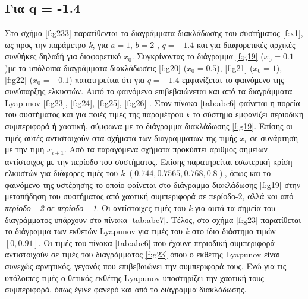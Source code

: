 \subsection{Για q = -1.4}
Στο σχήμα \ref{f:g233} παρατίθενται τα διαγράμματα διακλάδωσης του συστήματος \ref{f:x1}, ως προς την παράμετρο \emph{k}, για $a = 1$, $b = 2$ , $q =- 1.4$ και για διαφορετικές αρχικές συνθήκες δηλαδή για διαφορετικό \(x_0\). Συγκρίνοντας το διάγραμμα \ref{f:g19} (\(x_0=0.1\))με τα υπόλοιπα διαγράμματα διακλάδωσεις \ref{f:g20} (\(x_0=0.5\)), \ref{f:g21} (\(x_0=1\)), \ref{f:g22} (\(x_0=-0.1\)) πατατηρείται ότι για $q=-1.4$ εμφανίζεται το φαινόμενο της συνύπαρξης ελκυστών. Αυτό το φαινόμενο επιβεβαιώνεται και από τα διαγράμματα Lyapunov \ref{f:g23}, \ref{f:g24}, \ref{f:g25}, \ref{f:g26} .
Στον πίνακα \ref{tab:abc6} φαίνεται η πορεία του συστήματος και για ποιές τιμές της παραμέτρου  \emph{k} το σύστημα εμφανίζει περιοδική συμπεριφορά ή χαοτική, σύμφωνα με το διάγραμμα διακλάδωσης \ref{f:g19}. Επίσης οι τιμές αυτές αντιστοιχούν στα σχήματα των διαγραμματων της τιμής \(x_i\) σε συνάρτηση με την τιμή \(x_{i+1}\). Από τα παραγόμενα σχήματα προκύπτει αριθμός σημείων αντίστοιχος με την περίοδο του συστήματος.
Επίσης παρατηρείται εσωτερική κρίση ελκυστών για διάφορες τιμές του \emph{k} $(0.744, 0.7565 , 0.768 , 0.8)$, όπως και το φαινόμενο της υστέρησης το οποίο φαίνεται στο διάγραμμα διακλάδωσης \ref{f:g19} στην μεταπήδηση του συστήματος από χαοτική συμπεριφορά σε περίοδο-2, αλλά και από \emph{περίοδο - 2} σε \emph{περίοδο - 1}. Οι αντίστοιχες τιμές του \emph{k} για αυτά τα σημεία του διαγράμματος υπάρχουν στο πίνακα \ref{tab:abc7}.
Τέλος, στο σχήμα \ref{f:g23} παρατίθεται το διάγραμμα των εκθετών Lyapunov για τιμές του \emph{k} στο ίδιο διάστημα τιμών $[0, 0.91]$. Οι τιμές του πίνακα \ref{tab:abc6} που έχουνε περιοδική συμπεριφορά αντιστοιχούν σε τιμές του διαγράμματος \ref{f:g23} όπου ο εκθέτης Lyapunov είναι συνεχώς αρνητικός, γεγονός που επιβεβαιώνει την συμπεριφορά τους. Ενώ για τις υπόλοιπες τιμές ο θετικός εκθέτης Lyapunov υποστηρίζει την χαοτική τους συμπεριφορά, όπως έγινε φανερό και από το διάγραμμα διακλάδωσης.

